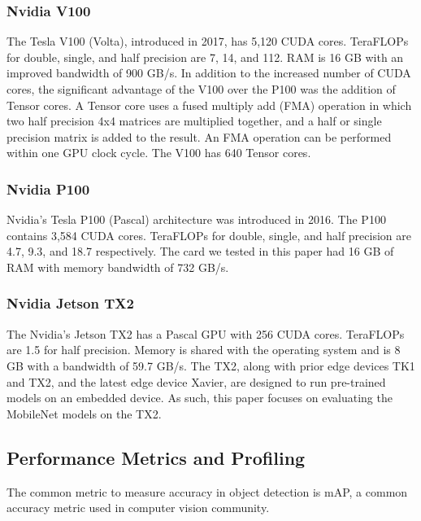 \documentclass[conference]{IEEEtran}
\begin{document}
\subsubsection{Nvidia V100}

The Tesla V100 (Volta), introduced in 2017, has 5,120 CUDA cores. TeraFLOPs for double, single, and half precision are 7, 14, and 112. RAM is 16 GB with an improved bandwidth of 900 GB/s. In addition to the increased number of CUDA cores, the significant advantage of the V100 over the P100 was the addition of Tensor cores. A Tensor core uses a fused multiply add (FMA) operation in which two half precision 4x4 matrices are multiplied together, and a half or single precision matrix is added to the result. An FMA operation can be performed within one GPU clock cycle. The V100 has 640 Tensor cores.

\subsubsection{Nvidia P100}

Nvidia's Tesla P100 (Pascal) architecture was introduced in 2016. The P100 contains 3,584 CUDA cores. TeraFLOPs for double, single, and half precision are 4.7, 9.3, and 18.7 respectively. The card we tested in this paper had 16 GB of RAM with memory bandwidth of  732 GB/s.


\subsubsection{Nvidia Jetson TX2}

The Nvidia's Jetson TX2 has a Pascal GPU with 256 CUDA cores. TeraFLOPs are 1.5 for half precision. Memory is shared with the operating system and is 8 GB with a bandwidth of 59.7 GB/s.
The TX2, along with prior edge devices TK1 and TX2, and the latest edge device Xavier, are designed to run pre-trained models on an embedded device. As such, this paper focuses on evaluating the MobileNet models on the TX2.

\subsection{Performance Metrics and Profiling}

The common metric to measure accuracy in object detection is mAP, a common accuracy metric used in computer vision community.
\end{document}
